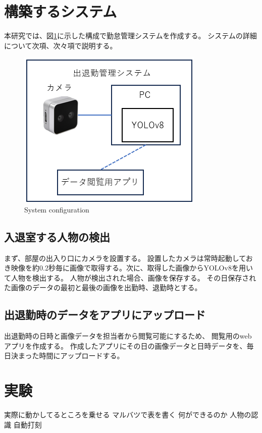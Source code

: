 \documentclass[10pt]{jarticle}
\begin{document}
    \section{構築するシステム}%
本研究では、図\ref{configuration}に示した構成で勤怠管理システムを作成する。
システムの詳細について次項、次々項で説明する。

\begin{figure}[!h]
\centering
\includegraphics[width=0.7\linewidth]{fig/composition.png}
\caption{System configuration}
\label{configuration}
\end{figure}

    \subsection{入退室する人物の検出}
まず、部屋の出入り口にカメラを設置する。
設置したカメラは常時起動しておき映像を約0.2秒毎に画像で取得する。次に、取得した画像からYOLOv8を用いて人物を検出する。
人物が検出された場合、画像を保存する。
その日保存された画像のデータの最初と最後の画像を出勤時、退勤時とする。

    \subsection{出退勤時のデータをアプリにアップロード}
出退勤時の日時と画像データを担当者から閲覧可能にするため、
閲覧用のwebアプリを作成する。
作成したアプリにその日の画像データと日時データを、毎日決まった時間にアップロードする。


     
    \section{実験}%
実際に動かしてるところを乗せる
マルバツで表を書く
何ができるのか
人物の認識
自動打刻
\end{document}
